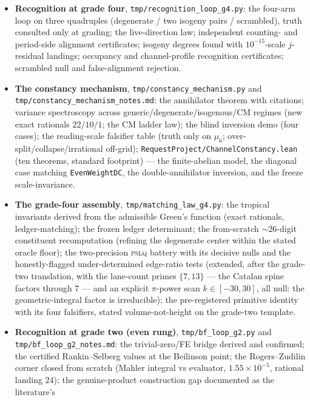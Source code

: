 \documentclass[11pt]{article}
\theoremstyle{definition}
\theoremstyle{remark}
\begin{document}
\begin{itemize}
mis-pair diverge; the degree-16 $G\ast\bar G$ identity at $2.4\times10^{-13}$;
the radial-head toll measured; the unit-scale window falsifier).
\item \textbf{Recognition at grade four},
\texttt{tmp/recognition\_loop\_g4.py}: the four-arm loop on three quadruples
(degenerate / two isogeny pairs / scrambled), truth consulted only at
grading; the live-direction law; independent counting- and period-side
alignment certificates; isogeny degrees found with $10^{-15}$-scale
$j$-residual landings; occupancy and channel-profile recognition
certificates; scrambled null and false-alignment rejection.
\item \textbf{The constancy mechanism},
\texttt{tmp/constancy\_mechanism.py} and
\texttt{tmp/constancy\_mechanism\_notes.md}: the annihilator theorem with
citations; variance spectroscopy across generic/degenerate/isogenous/CM
regimes (new exact rationals $22/10/1$; the CM ladder law); the blind
inversion demo (four cases); the reading-scale falsifier table (truth only
on $\mu_6$; over-split/collapse/irrational off-grid);
\texttt{RequestProject/ChannelConstancy.lean}
(ten theorems, standard footprint) --- the finite-abelian model, the
diagonal case matching \texttt{EvenWeightDC}, the double-annihilator
inversion, and the freeze scale-invariance.
\item \textbf{The grade-four assembly},
\texttt{tmp/matching\_law\_g4.py}: the tropical invariants derived from the
admissible Green's function (exact rationals, ledger-matching); the frozen
ledger determinant; the from-scratch $\sim\!26$-digit constituent
recomputation (refining the degenerate center within the stated oracle
floor); the two-precision \textsc{pslq} battery with its decisive nulls and
the honestly-flagged under-determined edge-ratio tests (extended, after the
grade-two translation, with the lane-count primes $\{7,13\}$ --- the
Catalan spine factors through $7$ --- and an explicit $\pi$-power scan
$k\in[-30,30]$, all null: the geometric-integral factor is irreducible);
the pre-registered primitive identity with its four falsifiers, stated
volume-not-height on the grade-two template.
\item \textbf{Recognition at grade two (even rung)},
\texttt{tmp/bf\_loop\_g2.py} and \texttt{tmp/bf\_loop\_g2\_notes.md}: the
trivial-zero/FE bridge derived and confirmed; the certified Rankin--Selberg
values at the Beilinson point; the Rogers--Zudilin corner closed from
scratch (Mahler integral vs evaluator, $1.55\times10^{-5}$, rational landing
$24$); the genuine-product construction gap documented as the literature's

\end{itemize}
\end{document}
